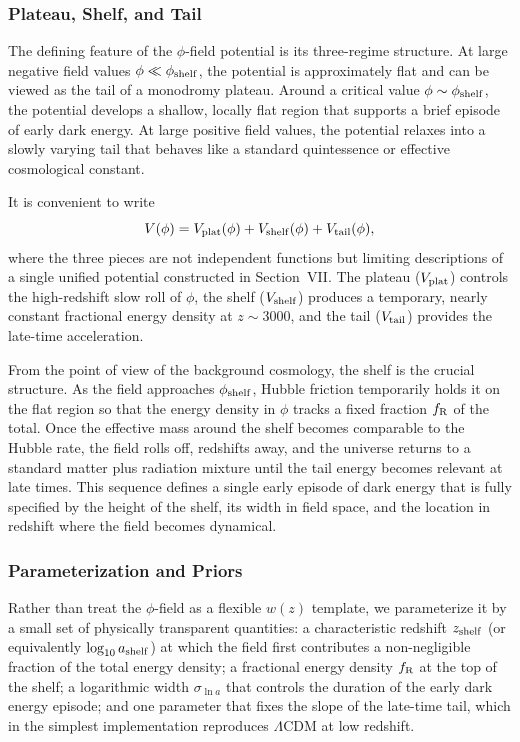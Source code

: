 \documentclass[a4paper,11pt]{article}
\begin{document}
\subsubsection{Plateau, Shelf, and Tail}

The defining feature of the $\phi$-field potential is its three-regime structure. At large negative field values $\phi \ll \phi_{\rm shelf}$, the potential is approximately flat and can be viewed as the tail of a monodromy plateau. Around a critical value $\phi \sim \phi_{\rm shelf}$, the potential develops a shallow, locally flat region that supports a brief episode of early dark energy. At large positive field values, the potential relaxes into a slowly varying tail that behaves like a standard quintessence or effective cosmological constant.

It is convenient to write
\begin{equation}
V(\phi) = V_{\rm plat}(\phi) + V_{\rm shelf}(\phi) + V_{\rm tail}(\phi) ,
\end{equation}
where the three pieces are not independent functions but limiting descriptions of a single unified potential constructed in Section~VII. The plateau ($V_{\rm plat}$) controls the high-redshift slow roll of $\phi$, the shelf ($V_{\rm shelf}$) produces a temporary, nearly constant fractional energy density at $z \sim 3000$, and the tail ($V_{\rm tail}$) provides the late-time acceleration.

From the point of view of the background cosmology, the shelf is the crucial structure. As the field approaches $\phi_{\rm shelf}$, Hubble friction temporarily holds it on the flat region so that the energy density in $\phi$ tracks a fixed fraction $f_{\rm R}$ of the total. Once the effective mass around the shelf becomes comparable to the Hubble rate, the field rolls off, redshifts away, and the universe returns to a standard matter plus radiation mixture until the tail energy becomes relevant at late times. This sequence defines a single early episode of dark energy that is fully specified by the height of the shelf, its width in field space, and the location in redshift where the field becomes dynamical.

\subsubsection{Parameterization and Priors}

Rather than treat the $\phi$-field as a flexible $w(z)$ template, we parameterize it by a small set of physically transparent quantities: a characteristic redshift $z_{\rm shelf}$ (or equivalently $\log_{10} a_{\rm shelf}$) at which the field first contributes a non-negligible fraction of the total energy density; a fractional energy density $f_{\rm R}$ at the top of the shelf; a logarithmic width $\sigma_{\ln a}$ that controls the duration of the early dark energy episode; and one parameter that fixes the slope of the late-time tail, which in the simplest implementation reproduces $\Lambda$CDM at low redshift.
\end{document}
